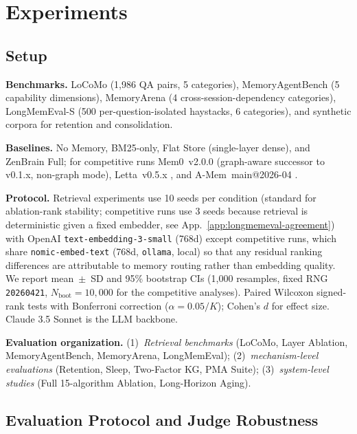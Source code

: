 \documentclass{article}
\begin{document}
\section{Experiments}
\label{sec:experiments}

\subsection{Setup}

\textbf{Benchmarks.} LoCoMo \citep{maharana2024locomo}
(1{,}986 QA pairs, 5 categories), MemoryAgentBench
\citep{he2025memoryagentbench} (5 capability dimensions), MemoryArena
\citep{he2026memoryarena} (4 cross-session-dependency categories),
LongMemEval-S \citep{wu2024longmemeval} (500 per-question-isolated
haystacks, 6 categories), and synthetic corpora for retention and
consolidation.

\textbf{Baselines.} No Memory, BM25-only, Flat Store (single-layer dense),
and ZenBrain Full; for competitive runs Mem0~v2.0.0
\citep{chhikara2025mem0} (graph-aware successor to v0.1.x, non-graph mode),
Letta~v0.5.x \citep{packer2023memgpt}, and
A-Mem~main@2026-04 \citep{tiwari2026multilayered}.

\textbf{Protocol.} Retrieval experiments use 10 seeds per condition
(standard for ablation-rank stability; competitive runs use 3 seeds
because retrieval is deterministic given a fixed embedder, see
App.~\ref{app:longmemeval-agreement}) with OpenAI
\texttt{text-embedding-3-small} (768d) except competitive runs, which
share \texttt{nomic-embed-text} (768d, \texttt{ollama}, local) so that
any residual ranking differences are attributable to memory routing
rather than embedding quality.
We report mean~$\pm$~SD and 95\% bootstrap CIs (1{,}000 resamples,
fixed RNG \texttt{20260421}, $N_{\text{boot}}=10{,}000$ for the
competitive analyses). Paired Wilcoxon signed-rank tests with
Bonferroni correction ($\alpha = 0.05/K$); Cohen's $d$ for effect size.
Claude 3.5 Sonnet is the LLM backbone.

\textbf{Evaluation organization.} (1)~\emph{Retrieval benchmarks}
(LoCoMo, Layer Ablation, MemoryAgentBench, MemoryArena, LongMemEval);
(2)~\emph{mechanism-level evaluations} (Retention, Sleep, Two-Factor
KG, PMA Suite); (3)~\emph{system-level studies} (Full 15-algorithm
Ablation, Long-Horizon Aging).

\subsection{Evaluation Protocol and Judge Robustness}
\label{sec:judge-robustness}
\end{document}
